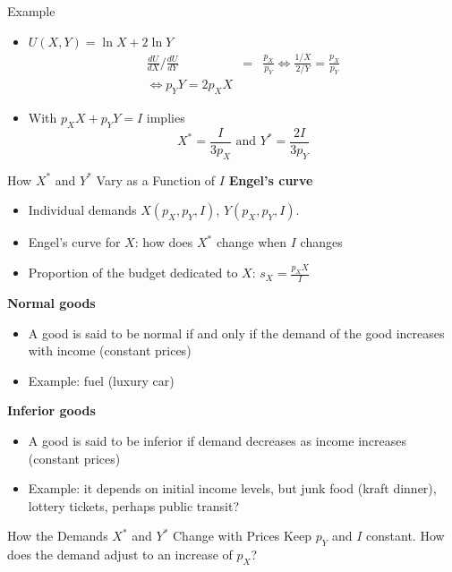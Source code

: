 \documentclass[handout]{beamer}
\newenvironment{iPar}[1]{\textbf{#1} \begin{itemize}}{\end{itemize}}
\begin{document}
\begin{frame}{Example}
\begin{itemize}
\item $U(X,Y) = \ln X +  2\ln Y$ \pause
\begin{eqnarray*}\frac{dU}{dX}\Bigg/\frac{dU}{dY} &=& \frac{p_X}{p_Y} \iff \frac{1/X}{2/Y} = \frac{p_X}{p_Y} \\ \iff  p_Y Y = 2p_X X \end{eqnarray*}
\item With $p_X X + p_Y Y =  I$ implies $$X^* = \frac{I}{3p_X} \textrm{ and } Y^* = \frac{2I}{3p_Y}$$

\end{itemize}
\end{frame}


\begin{frame}{How $X^*$ and $Y^*$ Vary as a Function of $I$}
\begin{iPar}{Engel's curve}
\item Individual demands  $X(p_X,p_Y,I)$, $Y(p_X,p_Y,I)$.
\item Engel's curve for $X$: how does $X^*$ change when $I$ changes
\item Proportion of the budget dedicated to $X$: $s_X = \frac{p_X X}{I}$
\end{iPar} 

\begin{iPar}{Normal goods}
\item A good is said to be normal if and only if the demand of the good increases with income (constant prices)
\item Example: fuel (luxury car)
\end{iPar}

\begin{iPar}{Inferior goods}
\item A good is said to be inferior if demand decreases as income increases (constant prices)
\item Example:  it depends on initial income levels, but junk food (kraft dinner), lottery tickets, perhaps public transit?
\end{iPar}

\end{frame}

\begin{frame}{How the Demands $X^*$ and $Y^*$ Change with Prices}
Keep $p_Y$ and $I$ constant. How does the demand adjust to an increase of $p_X$? 

\end{frame}
\end{document}
